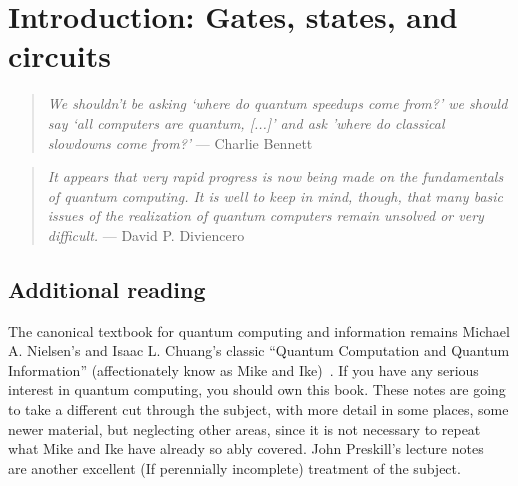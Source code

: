 

\clearpage


\clearpage
\section{Introduction: Gates, states, and circuits}


\begin{quote}
\emph{We shouldn't be asking `where do quantum speedups come from?' we should say `all computers are quantum, [...]' and ask 'where do classical slowdowns come from?'} --- Charlie Bennett~\cite{???}
\end{quote}


\begin{quote}
\emph{It appears that very rapid progress is now being made on the fundamentals of quantum computing. It is well to keep in mind, though, that many basic issues of the realization of quantum computers remain unsolved or very difficult.} --- David P. Diviencero ~\cite{DiVincenzo1995a}
\end{quote}

%
%
%
%
%
%
%

\subsection{Additional reading}
The canonical textbook for quantum computing and information remains Michael A. Nielsen's and Isaac L. Chuang's   
classic ``Quantum Computation and Quantum Information'' (affectionately know as Mike and Ike)~\cite{Nielsen2000a}.  
If you have any serious interest in quantum computing, you should own this book.
These notes are 
going to take a different cut through the subject, with more detail in some places, some newer material, but neglecting other areas, since it is not necessary to repeat what Mike and Ike have already so ably covered. John Preskill's lecture notes~\cite{PreskillLectureNotes} are another excellent (If perennially incomplete) treatment of the subject.

